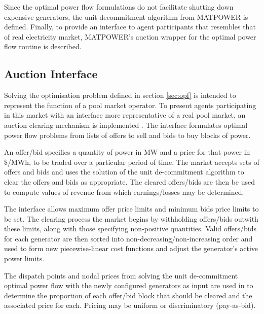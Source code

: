 
Since the optimal power flow formulations do not facilitate shutting down
expensive generators, the unit-decommitment algorithm from MATPOWER is defined.
Finally, to provide an interface to agent participants that resembles that of
real electricity market, MATPOWER's auction wrapper for the optimal power flow
routine is described.




\subsection{Auction Interface}
Solving the optimisation problem defined in section \ref{sec:opf} is
intended to represent the function of a pool market operator.  To present
agents participating in this market with an interface more representative of a
real pool market, an auction clearing mechanism is implemented
\cite[p.31]{pserc:mp_manual}.  The interface formulates optimal power flow
problems from lists of offers to sell and bids to buy blocks of power.

An offer/bid specifies a quantity of power in MW and a price for that power in
\$/MWh, to be traded over a particular period of time.  The market accepts sets
of offers and bids and uses the solution of the unit de-commitment algorithm to
clear the offers and bids as appropriate.  The cleared offers/bids are then be
used to compute values of revenue from which earnings/losses may be determined.

The interface allows maximum offer price limits and minimum bids price limits
to be set.  The clearing process the market begins by withholding offers/bids
outwith these limits, along with those specifying non-positive quantities.
Valid offers/bids for each generator are then sorted into
non-decreasing/non-increasing order and used to form new piecewise-linear cost
functions and adjust the generator's active power limits.

The dispatch points and nodal prices from solving the unit de-commitment
optimal power flow with the newly configured generators as input are used in
to determine the proportion of each offer/bid block that should be
cleared and the associated price for each.  Pricing may be uniform or
discriminatory (pay-as-bid).

